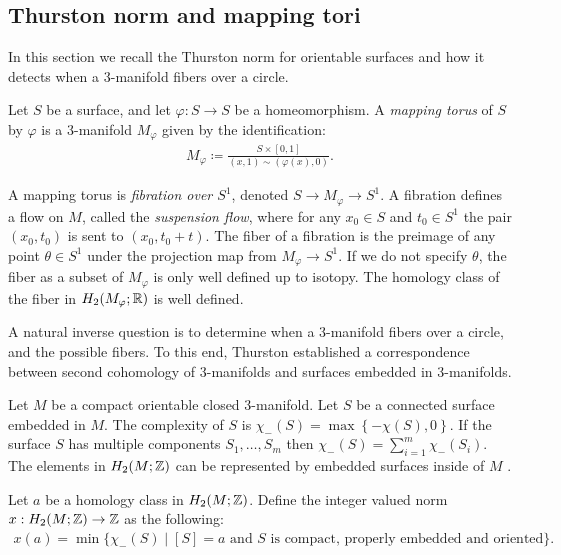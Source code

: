 \subsection{Thurston norm and mapping tori}
\label{sec:backgr-thurst-norm}
In this section we recall the Thurston norm for orientable surfaces and how it detects when a 3-manifold fibers over a circle.

 Let $S$ be a surface, and let $\varphi: S \to S$ be a homeomorphism.  A {\it mapping torus} of $S$ by $\varphi$ is a $3$-manifold $M_\varphi$ given by the identification:
\begin{align*}
  M_\varphi \coloneqq \frac{S \times [0,1]}{(x,1) \sim (\varphi(x), 0)}.
\end{align*}

A mapping torus is \emph{fibration over $S^1$}, denoted $S\rightarrow M_\varphi\rightarrow S^1$.
A fibration defines a flow on $M$, called the \emph{suspension flow}, where for any $x_0\in S$ and $t_0\in S^1$ the pair $(x_0,t_0)$ is sent to $(x_0,t_0+t)$.
The fiber of a fibration is the preimage of any point $\theta \in S^1$ under the projection map from $M_{\varphi} \to S^1$.
If we do not specify $\theta$, the fiber as a subset of $M_\varphi$ is only well defined up to isotopy.   The homology class of the fiber in $H_2(M_{\varphi}; \mathbb{R})$ is well defined.

A natural inverse question is to determine when a 3-manifold fibers over a circle, and the possible fibers.  To this end, Thurston established a correspondence between second cohomology of 3-manifolds and surfaces embedded in 3-manifolds.

 Let $M$ be a compact orientable closed $3$-manifold.
Let $S$ be a connected surface embedded in $M$.  The complexity of $S$ is $\chi_-(S) = \max\left\{-\chi(S),0\right\}$.
If the surface $S$ has multiple components $S_1, \ldots, S_m$ then $\chi_-(S) = \displaystyle\sum_{i=1}^m\chi_-(S_i)$.
The elements in $H_2(M ; \mathbb{Z})$ can be represented by embedded surfaces inside of $M$ \cite[Lemma 1]{thurston1986norm}.


 Let $a$ be a homology class in $H_2(M; \mathbb{Z})$.  Define the integer valued norm $x:H_2(M;\mathbb{Z})\rightarrow \mathbb{Z}$ as the following:
\begin{align*}
  x(a) = \min\{\chi_-(S) \mid [S] = a \text{ and $S$ is compact, properly embedded and oriented}\}.
\end{align*}

